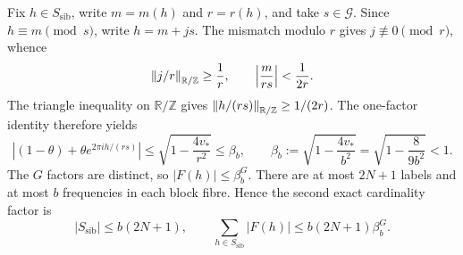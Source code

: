 Fix $h\in S_{\mathrm{sib}}$, write $m=m(h)$ and $r=r(h)$, and take
$s\in\mathcal G$.  Since $h\equiv m\pmod s$, write $h=m+js$.  The mismatch
modulo $r$ gives $j\not\equiv0\pmod r$, whence
\[
 \left\lVert j/r\right\rVert_{\mathbb R/\mathbb Z}\ge\frac1r,
 \qquad
 \left|\frac{m}{rs}\right|<\frac1{2r}.
\]
The triangle inequality on $\mathbb R/\mathbb Z$ gives
$\left\lVert h/(rs)\right\rVert_{\mathbb R/\mathbb Z}\ge1/(2r)$.  The one-factor identity therefore yields
\begin{equation}\label{eq:aux-factor}
 \left|(1-\theta)+\theta e^{2\pi ih/(rs)}\right|
 \le\sqrt{1-\frac{4v_*}{r^2}}
 \le\beta_b,
 \qquad
 \beta_b:=\sqrt{1-\frac{4v_*}{b^2}}
 =\sqrt{1-\frac8{9b^2}}<1.
\end{equation}
The $G$ factors are distinct, so $|F(h)|\le\beta_b^G$.  There are at most
$2N+1$ labels and at most $b$ frequencies in each block fibre.  Hence the
second exact cardinality factor is
\begin{equation}\label{eq:sibling-count}
 |S_{\mathrm{sib}}|\le b(2N+1),
 \qquad
 \sum_{h\in S_{\mathrm{sib}}}|F(h)|
 \le b(2N+1)\beta_b^G.
\end{equation}
